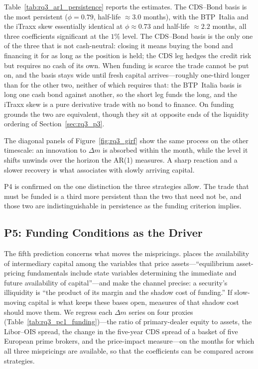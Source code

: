 Table~\ref{tab:rq3_ar1_persistence} reports the estimates. The
CDS--Bond basis is the most persistent ($\phi = 0.79$, half-life
$\approx 3.0$ months), with the BTP~Italia and the iTraxx skew
essentially identical at $\phi \approx 0.73$ and half-life
$\approx 2.2$ months, all three coefficients significant at the
$1\%$ level. The CDS--Bond basis is the only one of the three that is
not cash-neutral: closing it means buying the bond and financing it for
as long as the position is held; the CDS leg hedges the credit risk but
requires no cash of its own. When funding is scarce the trade cannot be
put on, and the basis stays wide until fresh capital arrives---roughly
one-third longer than for the other two, neither of which requires
that: the BTP~Italia basis is long one cash bond against another, so
the short leg funds the long, and the iTraxx skew is a pure derivative
trade with no bond to finance. On funding grounds the two are
equivalent, though they sit at opposite ends of the liquidity ordering
of Section~\ref{sec:rq3_p3}.

The diagonal panels of Figure~\ref{fig:rq3_girf} show the same process
on the other timescale: an innovation to $\Delta m$ is absorbed within
the month, while the level it shifts unwinds over the horizon the
AR(1) measures. A sharp reaction and a slower recovery is what
\citet{duffie2010presidential} associates with slowly arriving capital.

P4 is confirmed on the one distinction the three strategies allow. The
trade that must be funded is a third more persistent than the two that
need not be, and those two are indistinguishable in persistence as the
funding criterion implies.



\subsection{P5: Funding Conditions as the Driver}
\label{sec:rq3_p5}

The fifth prediction concerns what moves the mispricings.
\citet{duffie2010presidential} places the availability of intermediary
capital among the variables that price assets---``equilibrium
asset-pricing fundamentals include state variables determining the
immediate and future availability of capital''---and
\citet{brunnermeier2009market} make the channel precise: a security's
illiquidity is ``the product of its margin and the shadow cost of
funding.'' If slow-moving capital is what keeps these bases open,
measures of that shadow cost should move them. We regress each
$\Delta m$ series on four proxies
(Table~\ref{tab:rq3_pc1_funding})---the \citet{he2017intermediary}
ratio of primary-dealer equity to assets, the Libor--OIS spread, the
change in the five-year CDS spread of a basket of five European prime
brokers, and the \citet{amihud2015pricing} price-impact measure---on
the months for which all three mispricings are available, so that the
coefficients can be compared across strategies.


